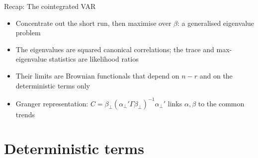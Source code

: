 \begin{frame}{Recap: The cointegrated VAR}
\itemsize{\small}
\begin{itemize}
    \item Concentrate out the short run, then maximise over $\beta$: a generalised eigenvalue problem
    \item The eigenvalues are squared canonical correlations; the trace and max-eigenvalue statistics are likelihood ratios
    \item Their limits are Brownian functionals that depend on $n - r$ and on the deterministic terms only
    \item Granger representation: $C = \beta_\perp(\alpha_\perp'\Gamma\beta_\perp)^{-1}\alpha_\perp'$ links $\alpha, \beta$ to the common trends
\end{itemize}
\end{frame}


\section{Deterministic terms}

